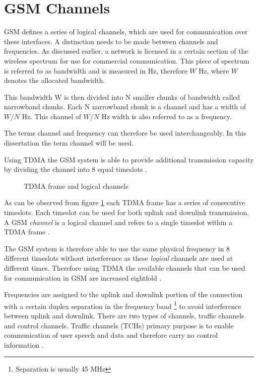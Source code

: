 \section{GSM Channels}
\label{sec:interfacech}
GSM defines a series of logical channels, which are used for communication over these interfaces. A distinction needs to be made between channels and frequencies. As discussed earlier, a network is licensed in a certain section of the wireless spectrum for use for commercial communication. This piece of spectrum is referred to as bandwidth and is measured in Hz, therefore $W$ Hz, where $W$ denotes the allocated bandwidth\cite{FundamentalsWirelessCommunication}.

This bandwidth W is then divided into N smaller chunks of bandwidth called narrowband chunks. Each N narrowband chunk is a channel and has a width of $W/N$ Hz\cite{FundamentalsWirelessCommunication}. This channel of $W/N$ Hz width is also referred to as a frequency.\label{def:channel}

The terms channel and frequency can therefore be used interchangeably. In this dissertation the term channel will be used.

Using TDMA the GSM system is able to provide additional transmission capacity by dividing the channel into 8 equal timeslots \cite{wirelesstelcoMullet}. 
\begin{figure}[h]
	\begin{centering}
		
		\caption{TDMA frame and logical channels \cite{wirelesstelcoMullet}}
		\label{fig:GSMChannels}
	\end{centering}
\end{figure}
As can be observed from figure \ref{fig:GSMChannels} each TDMA frame has a series of consecutive timeslots. Each timeslot can be used for both uplink and downlink transmission. A GSM \emph{channel} is a logical channel and refers to a single timeslot within a TDMA frame \cite{wirelesstelcoMullet,GSMArchitectureProtocolsServices}.

The GSM system is therefore able to use the same physical frequency in 8 different timeslots without interference as these \emph{logical} channels are used at different times. Therefore using TDMA the available channels that can be used for communication in GSM are increased eightfold \cite{wirelesstelcoMullet}.

Frequencies are assigned to the uplink and downlink portion of the connection with a certain duplex separation in the frequency band \footnote{Separation is usually 45 MHz} to avoid interference between uplink and downlink. There are two types of channels, traffic channels and control channels. Traffic channels (TCHs) primary purpose is to enable communication of user speech and data and therefore carry no control information \cite{GSMArchitectureProtocolsServices}.


